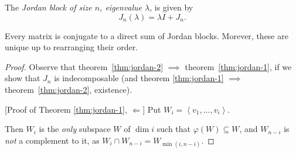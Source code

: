 \begin{definition}
	The \emph{Jordan block of size $n$, eigenvalue $\lambda$}, is given by %
	\begin{equation*}
		J_n(\lambda) = \lambda I + J_n.
	\end{equation*}
\end{definition}

\begin{theorem}
	 Every matrix is conjugate to a direct sum of Jordan blocks. Morever, these are unique up to rearranging their order. %
	\label{thm:jordan-2}
\end{theorem}

\begin{proof}
Observe that theorem~\ref{thm:jordan-2} $\implies$ theorem~\ref{thm:jordan-1}, if we show that $J_n$ is indecomposable (and theorem \ref{thm:jordan-1} $\implies$ theorem~\ref{thm:jordan-2}, existence). %
	

	[Proof of Theorem \ref{thm:jordan-1}, $\Leftarrow$] 
	Put $W_i=\left\langle v_1,\dots,v_i \right\rangle$.
	
	Then $W_i$ is the \emph{only} subspace $W$ of $\dim i$ such that $\varphi(W)\subseteq W$, %
	and $W_{n-i}$ is \emph{not} a complement to it, as $W_i \cap W_{n-i} = W_{\min(i,n-i)}$. %
\end{proof}

